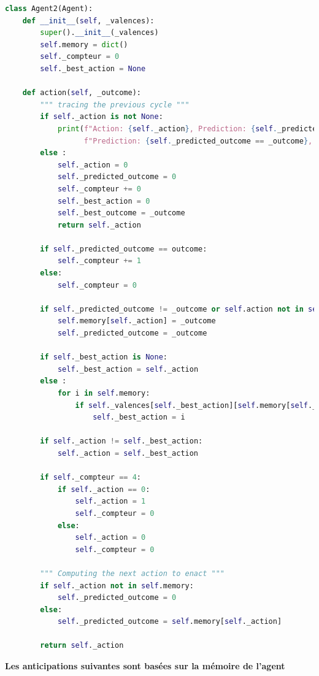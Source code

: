 \documentclass[a4paper, 12pt]{article}
\begin{document}
\begin{lstlisting}[language=Python, caption={Implementation de l'Agent2}]
    class Agent2(Agent):
    def __init__(self, _valences):
        super().__init__(_valences)
        self.memory = dict()
        self._compteur = 0
        self._best_action = None
    
    def action(self, _outcome):
        """ tracing the previous cycle """
        if self._action is not None:
            print(f"Action: {self._action}, Prediction: {self._predicted_outcome}, Outcome: {_outcome}, "
                  f"Prediction: {self._predicted_outcome == _outcome}, Valence: {self._valences[self._action][_outcome]}")
        else :
            self._action = 0
            self._predicted_outcome = 0
            self._compteur += 0
            self._best_action = 0
            self._best_outcome = _outcome
            return self._action
        
        if self._predicted_outcome == outcome:
            self._compteur += 1
        else:
            self._compteur = 0
            
        if self._predicted_outcome != _outcome or self.action not in self.memory:
            self.memory[self._action] = _outcome
            self._predicted_outcome = _outcome
            
        if self._best_action is None:
            self._best_action = self._action
        else :
            for i in self.memory:
                if self._valences[self._best_action][self.memory[self._best_action]] < self._valences[i][self.memory[i]]:
                    self._best_action = i
            
        if self._action != self._best_action:
            self._action = self._best_action
        
        if self._compteur == 4:
            if self._action == 0:
                self._action = 1
                self._compteur = 0
            else:
                self._action = 0
                self._compteur = 0
        
        """ Computing the next action to enact """
        if self._action not in self.memory:
            self._predicted_outcome = 0
        else:
            self._predicted_outcome = self.memory[self._action]
            
        return self._action
\end{lstlisting}

\bigskip

\noindent \large \textbf{Les anticipations suivantes sont basées sur la mémoire de l'agent}
\normalsize
\end{document}
